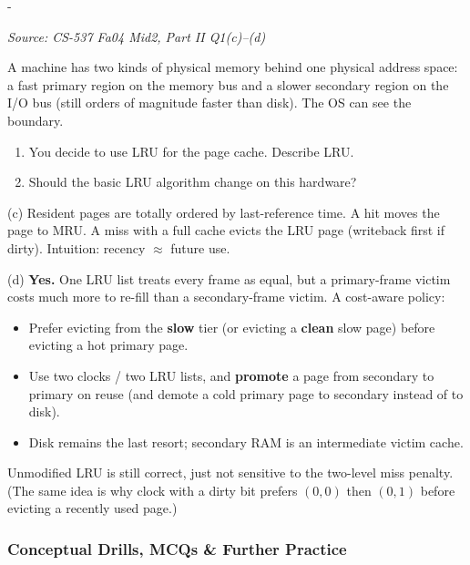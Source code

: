 \documentclass[11pt,a4paper]{article}
\makeatletter
\newcommand{\keepspace}[1]{\par\penalty-100\begingroup
  \setlength{\dimen@}{#1}\dimen@ii\pagegoal\advance\dimen@ii-\pagetotal
  \ifdim\dimen@>\dimen@ii\ifdim\dimen@ii>\z@\vfil\fi\break\fi\endgroup}
\newcounter{qn}[section]
\newenvironment{Qn}[4]{%
  \refstepcounter{qn}\keepspace{7\baselineskip}%
  \begin{tcolorbox}[qboxstyle, title={Q\thesection.\theqn\ \ [#1 \textbar\ #2]\ \ #4}]%
  {\footnotesize\color{g3}\textit{Source: #3}}\par\smallskip%
}{%
  \end{tcolorbox}%
}
\newenvironment{Sol}{%
  \begin{tcolorbox}[sboxstyle, title={Solution}]%
}{%
  \end{tcolorbox}\vspace{0.35em}%
}
\makeatother
\begin{document}
\begin{Qn}{Medium-Hard}{Lect 15}{CS-537 Fa04 Mid2, Part II Q1(c)--(d)}{Should LRU change when RAM is split into a fast tier and a slow tier?}
A machine has two kinds of physical memory behind one physical address
space: a fast primary region on the memory bus and a slower secondary
region on the I/O bus (still orders of magnitude faster than disk). The
OS can see the boundary.
\begin{enumerate}
  \item[(c)] You decide to use LRU for the page cache. Describe LRU.
  \item[(d)] Should the basic LRU algorithm change on this hardware?
\end{enumerate}
\end{Qn}
\begin{Sol}
(c) Resident pages are totally ordered by last-reference time. A hit
moves the page to MRU. A miss with a full cache evicts the LRU page
(writeback first if dirty). Intuition: recency $\approx$ future use.

(d) \textbf{Yes.} One LRU list treats every frame as equal, but a
primary-frame victim costs much more to re-fill than a secondary-frame
victim. A cost-aware policy:
\begin{itemize}
  \item Prefer evicting from the \textbf{slow} tier (or evicting a
        \textbf{clean} slow page) before evicting a hot primary page.
  \item Use two clocks / two LRU lists, and \textbf{promote} a page
        from secondary to primary on reuse (and demote a cold primary
        page to secondary instead of to disk).
  \item Disk remains the last resort; secondary RAM is an intermediate
        victim cache.
\end{itemize}
Unmodified LRU is still correct, just not sensitive to the two-level
miss penalty. (The same idea is why clock with a dirty bit prefers
$(0,0)$ then $(0,1)$ before evicting a recently used page.)
\end{Sol}

\subsubsection*{Conceptual Drills, MCQs \& Further Practice}
\end{document}
